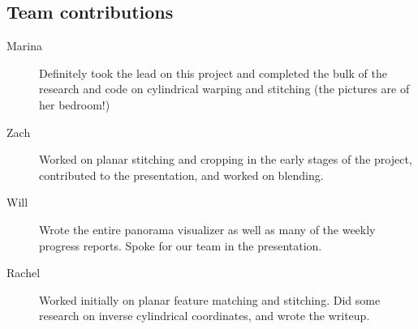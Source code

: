 \documentclass[10pt,twocolumn,letterpaper]{article}
\begin{document}
\subsection*{Team contributions}
\begin{description}
\item[Marina] Definitely took the lead on this project and completed the bulk of the research and code on cylindrical warping and stitching (the pictures are of her bedroom!)

\item[Zach] Worked on planar stitching and cropping in the early stages of the project, contributed to the presentation, and worked on blending.

\item [Will] Wrote the entire panorama visualizer as well as many of the weekly progress reports. Spoke for our team in the presentation. 

\item [Rachel] Worked initially on planar feature matching and stitching. Did some research on inverse cylindrical coordinates, and wrote the writeup.
\end{description}
\end{document}
